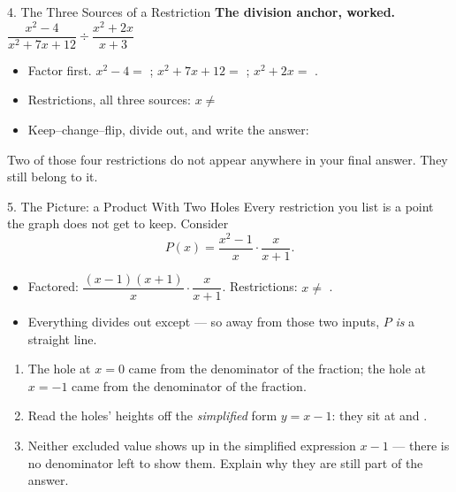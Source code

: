 \documentclass[10pt]{article}
\newcommand{\lgrid}[4]{%
  \draw[step=1, linegray!40, very thin] (#1,#3) grid (#2,#4);
  \draw[->, semithick, charcoal] (#1,0)--(#2,0) node[below right, font=\scriptsize]{$x$};
  \draw[->, semithick, charcoal] (0,#3)--(0,#4) node[left, font=\scriptsize]{$y$};}
\begin{document}
\begin{notesbox}{4. The Three Sources of a Restriction}
\vspace{5pt}
\textbf{The division anchor, worked.} \; $\dfrac{x^2-4}{x^2+7x+12}\div\dfrac{x^2+2x}{x+3}$
\begin{itemize}[leftmargin=1.5em, itemsep=3pt]
  \item Factor first. \; $x^2-4=$ \blank{2.4cm}; \quad $x^2+7x+12=$ \blank{2.6cm}; \quad
        $x^2+2x=$ \blank{1.8cm}.
  \item Restrictions, all three sources: $x\neq$ \blank{4.0cm}
  \item Keep--change--flip, divide out, and write the answer: \blank{3.0cm}
\end{itemize}
Two of those four restrictions do not appear anywhere in your final answer. They still belong to it.
\end{notesbox}

\begin{notesbox}{5. The Picture: a Product With Two Holes}
Every restriction you list is a point the graph does not get to keep. Consider
\[
  P(x)=\frac{x^2-1}{x}\cdot\frac{x}{x+1} .
\]
\begin{itemize}[leftmargin=1.5em, itemsep=3pt]
  \item Factored: $\dfrac{(x-1)(x+1)}{x}\cdot\dfrac{x}{x+1}$. \; Restrictions: $x\neq$ \blank{1.8cm}.
  \item Everything divides out except \blank{1.4cm} --- so away from those two inputs, $P$ \emph{is}
        a straight line.
\end{itemize}
\begin{center}
\end{center}
\begin{enumerate}[leftmargin=1.7em, itemsep=3pt]
  \item The hole at $x=0$ came from the denominator of the \blank{2.4cm} fraction; the hole at
        $x=-1$ came from the denominator of the \blank{2.4cm} fraction.
  \item Read the holes' heights off the \emph{simplified} form $y=x-1$: they sit at \blank{1.4cm}
        and \blank{1.6cm}.
  \item Neither excluded value shows up in the simplified expression $x-1$ --- there is no denominator
        left to show them. Explain why they are still part of the answer. \writeline
\end{enumerate}
\end{notesbox}
\end{document}
